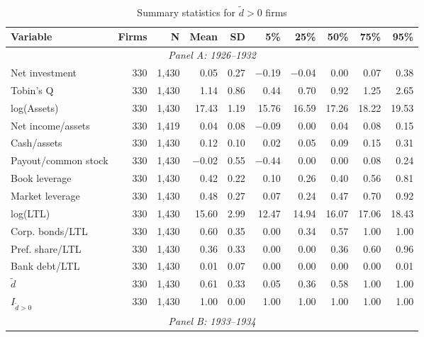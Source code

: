 \begin{table}[p]\centering
    \caption{\\ Summary statistics for $\tilde{d} > 0$ firms}\scriptsize
    \label{tabapp:summary_I_0}
    \begin{threeparttable}
        \begin{tabular}{lrrrrrrrrr}
            \toprule
            Variable & Firms & N & Mean & SD & 5\% & 25\% & 50\% & 75\% & 95\% \\
            \midrule
            \multicolumn{10}{c}{\textit{Panel A: 1926--1932}} \\
            \midrule
            Net investment & 330 & 1,430 & 0.05 & 0.27 & $-$0.19 & $-$0.04 & 0.00 & 0.07 & 0.38 \\
            Tobin's Q & 330 & 1,430 & 1.14 & 0.86 & 0.44 & 0.70 & 0.92 & 1.25 & 2.65 \\
            log(Assets) & 330 & 1,430 & 17.43 & 1.19 & 15.76 & 16.59 & 17.26 & 18.22 & 19.53 \\
            Net income/assets & 330 & 1,419 & 0.04 & 0.08 & $-$0.09 & 0.00 & 0.04 & 0.08 & 0.15 \\
            Cash/assets & 330 & 1,430 & 0.12 & 0.10 & 0.02 & 0.05 & 0.09 & 0.15 & 0.31 \\
            Payout/common stock & 330 & 1,430 & $-$0.02 & 0.55 & $-$0.44 & 0.00 & 0.00 & 0.08 & 0.24 \\
            Book leverage & 330 & 1,430 & 0.42 & 0.22 & 0.10 & 0.26 & 0.40 & 0.56 & 0.81 \\
            Market leverage & 330 & 1,430 & 0.48 & 0.27 & 0.07 & 0.24 & 0.47 & 0.70 & 0.92 \\
            log(LTL) & 330 & 1,430 & 15.60 & 2.99 & 12.47 & 14.94 & 16.07 & 17.06 & 18.43 \\
            Corp. bonds/LTL & 330 & 1,430 & 0.60 & 0.35 & 0.00 & 0.34 & 0.57 & 1.00 & 1.00 \\
            Pref. share/LTL & 330 & 1,430 & 0.36 & 0.33 & 0.00 & 0.00 & 0.36 & 0.60 & 0.96 \\
            Bank debt/LTL & 330 & 1,430 & 0.01 & 0.07 & 0.00 & 0.00 & 0.00 & 0.00 & 0.01 \\
            \ensuremath{\tilde{d}} & 330 & 1,430 & 0.61 & 0.33 & 0.05 & 0.36 & 0.58 & 1.00 & 1.00 \\
            \ensuremath{I_{\tilde{d}>0}} & 330 & 1,430 & 1.00 & 0.00 & 1.00 & 1.00 & 1.00 & 1.00 & 1.00 \\
            \midrule
            \multicolumn{10}{c}{\textit{Panel B: 1933--1934}} \\

\end{tabular}
\end{threeparttable}
\end{table}
